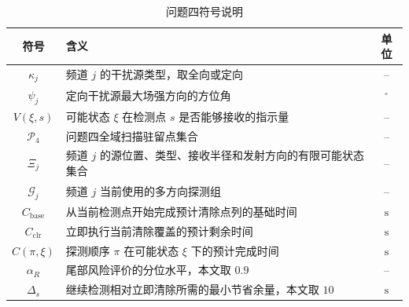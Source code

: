 \begin{table}[H]
  \centering
  \caption{问题四符号说明}
  \label{tab:q4-symbols}
  \begin{tabularx}{0.94\textwidth}{@{}cXc@{}}
    \toprule
    符号 & 含义 & 单位 \\
    \midrule
    $\kappa_j$ & 频道 $j$ 的干扰源类型，取全向或定向 & -- \\
    $\psi_j$ & 定向干扰源最大场强方向的方位角 & $^\circ$ \\
    $V(\xi,s)$ & 可能状态 $\xi$ 在检测点 $s$ 是否能够接收的指示量 & -- \\
    $\mathcal P_4$ & 问题四全域扫描驻留点集合 & -- \\
    $\Xi_j$ & 频道 $j$ 的源位置、类型、接收半径和发射方向的有限可能状态集合 & -- \\
    $\mathcal G_j$ & 频道 $j$ 当前使用的多方向探测组 & -- \\
    $C_{\mathrm{base}}$ & 从当前检测点开始完成预计清除点列的基础时间 & $\mathrm{s}$ \\
    $C_{\mathrm{clr}}$ & 立即执行当前清除覆盖的预计剩余时间 & $\mathrm{s}$ \\
    $C(\pi,\xi)$ & 探测顺序 $\pi$ 在可能状态 $\xi$ 下的预计完成时间 & $\mathrm{s}$ \\
    $\alpha_R$ & 尾部风险评价的分位水平，本文取 $0.9$ & -- \\
    $\Delta_s$ & 继续检测相对立即清除所需的最小节省余量，本文取 $10$ & $\mathrm{s}$ \\
    \bottomrule
  \end{tabularx}
\end{table}
